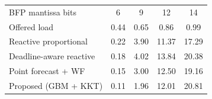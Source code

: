 \begin{tabular}{lcccc}
\hline
BFP mantissa bits & 6 & 9 & 12 & 14 \\
Offered load & 0.44 & 0.65 & 0.86 & 0.99 \\
\hline
Reactive proportional & 0.22 & 3.90 & 11.37 & 17.29 \\
Deadline-aware reactive & 0.18 & 4.02 & 13.84 & 20.38 \\
Point forecast + WF & 0.15 & 3.00 & 12.50 & 19.16 \\
Proposed (GBM + KKT) & 0.11 & 1.96 & 12.01 & 20.81 \\
\hline
\end{tabular}
